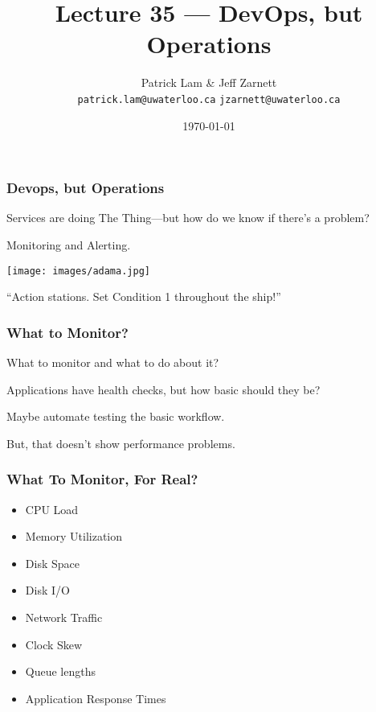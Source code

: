 

\title{Lecture 35 --- DevOps, but Operations }

\author{Patrick Lam \& Jeff Zarnett \\ \small \texttt{patrick.lam@uwaterloo.ca} \texttt{jzarnett@uwaterloo.ca}}
\date{\today}




\begin{frame}
  \titlepage

 \end{frame}


\begin{frame}
\frametitle{Devops, but Operations}

Services are doing The Thing---but how do we know if there's a problem?

Monitoring and Alerting.

\begin{center}
	\texttt{[image: images/adama.jpg]}
\end{center}
``Action stations. Set Condition 1 throughout the ship!''
\end{frame}


\begin{frame}
\frametitle{What to Monitor?}

What to monitor and what to do about it?

Applications have health checks, but how basic should they be?

Maybe automate testing the basic workflow.

But, that doesn't show performance problems.

\end{frame}


\begin{frame}
\frametitle{What To Monitor, For Real?}


\begin{itemize}
	\item CPU Load
	\item Memory Utilization
	\item Disk Space
	\item Disk I/O
	\item Network Traffic
	\item Clock Skew
	\item Queue lengths
	\item Application Response Times
\end{itemize}

\end{frame}


